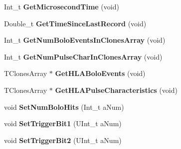 \begin{DoxyCompactItemize}
\item 
\hypertarget{class_edw_h_l_a_bolo_record_a2f2ce7591cb47559315b173714ed6e30}{
Int\_\-t {\bfseries GetMicrosecondTime} (void)}
\label{class_edw_h_l_a_bolo_record_a2f2ce7591cb47559315b173714ed6e30}

\item 
\hypertarget{class_edw_h_l_a_bolo_record_a266e0dca844706b179b28e0e00eff145}{
Double\_\-t {\bfseries GetTimeSinceLastRecord} (void)}
\label{class_edw_h_l_a_bolo_record_a266e0dca844706b179b28e0e00eff145}

\item 
\hypertarget{class_edw_h_l_a_bolo_record_a5b6c143d7234162047f161438ce97eed}{
Int\_\-t {\bfseries GetNumBoloEventsInClonesArray} (void)}
\label{class_edw_h_l_a_bolo_record_a5b6c143d7234162047f161438ce97eed}

\item 
\hypertarget{class_edw_h_l_a_bolo_record_a379b11ea031e505ede376537b0294549}{
Int\_\-t {\bfseries GetNumPulseCharInClonesArray} (void)}
\label{class_edw_h_l_a_bolo_record_a379b11ea031e505ede376537b0294549}

\item 
\hypertarget{class_edw_h_l_a_bolo_record_a3b4f6f07d3ed660d542da8a26a5c0363}{
TClonesArray $\ast$ {\bfseries GetHLABoloEvents} (void)}
\label{class_edw_h_l_a_bolo_record_a3b4f6f07d3ed660d542da8a26a5c0363}

\item 
\hypertarget{class_edw_h_l_a_bolo_record_afac959f67880d510aeca19827e2a138a}{
TClonesArray $\ast$ {\bfseries GetHLAPulseCharacteristics} (void)}
\label{class_edw_h_l_a_bolo_record_afac959f67880d510aeca19827e2a138a}

\item 
\hypertarget{class_edw_h_l_a_bolo_record_ad818a3be9f89d0428b1aab9fb8226ccc}{
void {\bfseries SetNumBoloHits} (Int\_\-t aNum)}
\label{class_edw_h_l_a_bolo_record_ad818a3be9f89d0428b1aab9fb8226ccc}

\item 
\hypertarget{class_edw_h_l_a_bolo_record_a43046059743d5927142196cd4c28b350}{
void {\bfseries SetTriggerBit1} (UInt\_\-t aNum)}
\label{class_edw_h_l_a_bolo_record_a43046059743d5927142196cd4c28b350}

\item 
\hypertarget{class_edw_h_l_a_bolo_record_aacfd50d7327a2ad96e72aad6906edac1}{
void {\bfseries SetTriggerBit2} (UInt\_\-t aNum)}
\label{class_edw_h_l_a_bolo_record_aacfd50d7327a2ad96e72aad6906edac1}


\end{DoxyCompactItemize}
